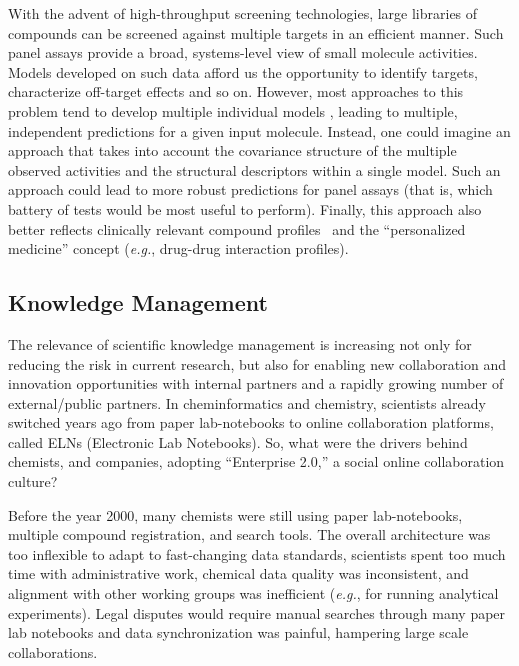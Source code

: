 \documentclass{sig-alternate}
\begin{document}
With the advent of high-throughput screening technologies, large
libraries of compounds can be screened against multiple targets in an
efficient manner. Such panel assays provide a broad, systems-level
view of small molecule activities.  Models developed on such data
afford us the opportunity to identify targets, characterize off-target
effects and so on. However, most approaches to this problem tend to
develop multiple individual models \cite{Chen:2010zr}, leading to
multiple, independent predictions for a given input molecule.
Instead, one could imagine an approach that takes into account the
covariance structure of the multiple observed activities and the
structural descriptors within a single model. Such an approach could
lead to more robust predictions for panel assays (that is, which 
battery of tests would be most useful to perform). Finally, this
approach also better reflects clinically relevant compound
profiles~\cite{kuhn2010} and the ``personalized medicine'' concept
(\emph{e.g.}, drug-drug interaction profiles).

\subsection{Knowledge Management}
\label{sec:knowledge-management}

The relevance of scientific knowledge management is increasing not
only for reducing the risk in current research, but also for enabling
new collaboration and innovation opportunities with internal partners and
a rapidly growing number of external/public partners. In
cheminformatics and chemistry, scientists already switched years
ago from paper lab-notebooks to online collaboration platforms, called
ELNs (Electronic Lab Notebooks). So, what were the drivers behind
chemists, and companies, adopting ``Enterprise 2.0,'' a social online
collaboration culture?

Before the year 2000, many chemists were still using paper
lab-notebooks, multiple compound registration, and search
tools. The overall architecture was too inflexible to
adapt to fast-changing data standards, scientists spent too much time
with administrative work, chemical data quality was inconsistent, and
alignment with other working groups was inefficient (\emph{e.g.}, for
running analytical experiments). Legal disputes would require manual
searches through many paper lab notebooks and data synchronization was
painful, hampering large scale collaborations.

\end{document}
